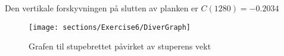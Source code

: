 Den vertikale forskyvningen på slutten av planken er $C(1280)=-0.2034$

\begin{figure}[h]
    \centering
    \texttt{[image: sections/Exercise6/DiverGraph]}
    \caption{Grafen til stupebrettet påvirket av stuperens vekt}
    \label{fig:divergraph}
\end{figure}

%